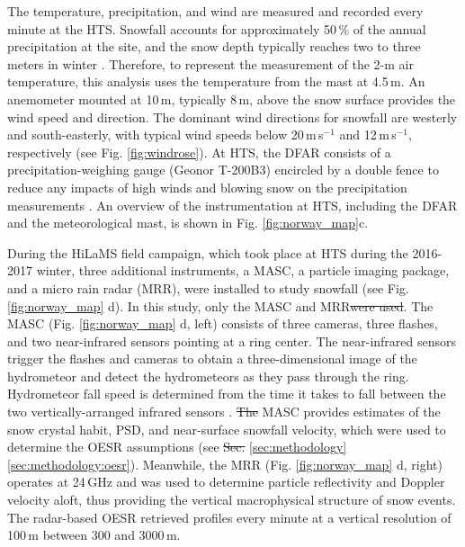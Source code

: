 \documentclass{ametsocV5}
\providecommand{\DIFadd}[1]{{\protect\color{blue}\uwave{#1}}} %
\providecommand{\DIFdel}[1]{{\protect\color{red}\sout{#1}}}                      %
\providecommand{\DIFaddbegin}{} %
\providecommand{\DIFaddend}{} %
\providecommand{\DIFdelbegin}{} %
\providecommand{\DIFdelend}{} %
\newcommand{\DIFscaledelfig}{0.5}
\newlength{\DIFdelgraphicswidth} %
\newlength{\DIFdelgraphicsheight} %
\newcommand{\DIFaddincludegraphics}[2][]{{\color{blue}\fbox{\DIFOincludegraphics[#1]{#2}}}} %
\newcommand{\DIFdelincludegraphics}[2][]{%
\sbox{\DIFdelgraphicsbox}{\DIFOincludegraphics[#1]{#2}}%
\settoboxwidth{\DIFdelgraphicswidth}{\DIFdelgraphicsbox} %
\settoboxtotalheight{\DIFdelgraphicsheight}{\DIFdelgraphicsbox} %
\scalebox{\DIFscaledelfig}{%
\parbox[b]{\DIFdelgraphicswidth}{\usebox{\DIFdelgraphicsbox}\\[-\baselineskip] \rule{\DIFdelgraphicswidth}{0em}}\llap{\resizebox{\DIFdelgraphicswidth}{\DIFdelgraphicsheight}{%
\setlength{\unitlength}{\DIFdelgraphicswidth}%
\begin{picture}(1,1)%
\thicklines\linethickness{2pt} %
{\color[rgb]{1,0,0}\put(0,0){\framebox(1,1){}}}%
{\color[rgb]{1,0,0}\put(0,0){\line( 1,1){1}}}%
{\color[rgb]{1,0,0}\put(0,1){\line(1,-1){1}}}%
\end{picture}%
}\hspace*{3pt}}} %
} %
\DeclareRobustCommand{\DIFaddbegin}{\DIFOaddbegin \let\includegraphics\DIFaddincludegraphics} %
\DeclareRobustCommand{\DIFaddend}{\DIFOaddend \let\includegraphics\DIFOincludegraphics} %
\DeclareRobustCommand{\DIFdelbegin}{\DIFOdelbegin \let\includegraphics\DIFdelincludegraphics} %
\DeclareRobustCommand{\DIFdelend}{\DIFOaddend \let\includegraphics\DIFOincludegraphics} %
\begin{document}
		The temperature, precipitation, and wind are measured and recorded every minute at the HTS. Snowfall accounts for approximately 50\,\% of the annual precipitation at the site, and the snow depth typically reaches two to three meters in winter \citep{wolff_derivation_2015}. Therefore, to represent the measurement of the 2-m air temperature, this analysis uses the temperature from the mast at 4.5\,m. An anemometer mounted at 10\,m, typically 8\,m, above the snow surface provides the wind speed and direction. The dominant wind directions for snowfall are westerly and south-easterly, with typical wind speeds below 20\,m\,s$^{-1}$ and 12\,m\,s$^{-1}$, respectively (see Fig. \ref{fig:windrose}). At HTS, the DFAR consists of a precipitation-weighing gauge (Geonor T-200B3) encircled by a double fence to reduce any impacts of high winds and blowing snow on the precipitation measurements \citep{goodison_wmo_1998}. An overview of the instrumentation at HTS, including the DFAR and the meteorological mast, is shown in Fig. \ref{fig:norway_map}c. 

		During the HiLaMS field campaign, which took place at HTS during the 2016-2017 winter, three additional instruments, a MASC, a particle imaging package, and a micro rain radar (MRR), were installed to study snowfall (see Fig. \ref{fig:norway_map} d). In this study, \DIFaddbegin \DIFadd{the OESR algorithm uses }\DIFaddend only the MASC and MRR\DIFdelbegin \DIFdel{were used}\DIFdelend . The MASC (Fig. \ref{fig:norway_map} d, left) consists of three cameras, three flashes, and two near-infrared sensors pointing at a ring center. The near-infrared sensors trigger the flashes and cameras to obtain a three-dimensional image of the hydrometeor and detect the hydrometeors as they pass through the ring. Hydrometeor fall speed is determined from the time it takes to fall between the two vertically-arranged infrared sensors \citep{garrett_fall_2012}. %
		\DIFdelbegin \DIFdel{The }\DIFdelend \DIFaddbegin \DIFadd{In addition, the }\DIFaddend MASC provides estimates of the snow crystal habit, PSD, and near-surface snowfall velocity, which were used to determine the OESR assumptions (see \DIFdelbegin \DIFdel{Sec. }\DIFdelend \DIFaddbegin \DIFadd{Section }\DIFaddend \ref{sec:methodology}\ref{sec:methodology:oesr}). Meanwhile, the MRR (Fig. \ref{fig:norway_map} d, right) operates at 24\,GHz and was used to determine particle reflectivity and Doppler velocity aloft, thus providing the vertical macrophysical structure of snow events. The radar-based OESR retrieved profiles every minute at a vertical resolution of 100\,m between 300 and 3000\,m. 
\end{document}
